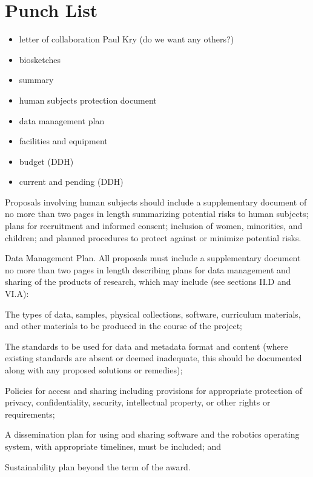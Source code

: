 \section{Punch List}

\begin{itemize}

\item letter of collaboration Paul Kry (do we want any others?)
\item biosketches
\item summary
\item human subjects protection document
\item data management plan
\item facilities and equipment
\item budget (DDH)
\item current and pending (DDH)

\end{itemize}




Proposals involving human subjects should include a supplementary document of no more than two pages in length summarizing potential risks to human subjects; plans for recruitment and informed consent; inclusion of women, minorities, and children; and planned procedures to protect against or minimize potential risks.

Data Management Plan. All proposals must include a supplementary document no more than two pages in length describing plans for data management and sharing of the products of research, which may include (see sections II.D and VI.A):

    The types of data, samples, physical collections, software, curriculum materials, and other materials to be produced in the course of the project;

    The standards to be used for data and metadata format and content (where existing standards are absent or deemed inadequate, this should be documented along with any proposed solutions or remedies);

    Policies for access and sharing including provisions for appropriate protection of privacy, confidentiality, security, intellectual property, or other rights or requirements;

    A dissemination plan for using and sharing software and the robotics operating system, with appropriate timelines, must be included; and

    Sustainability plan beyond the term of the award.